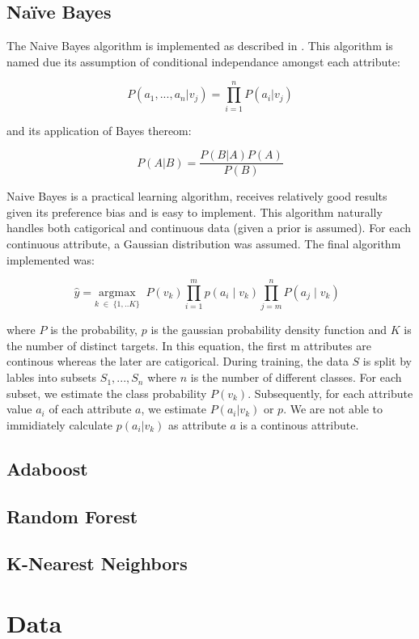 \documentclass[11pt]{article}
\begin{document}
\subsection{Naïve Bayes}
The Naive Bayes algorithm is implemented as described in \cite{Mitchell:1997:ML:541177}. This algorithm is named due its assumption of conditional independance amongst each attribute:

$$P(a_1,...,a_n|v_j) = \prod_{i=1}^{n}P(a_i|v_j)$$

and its application of Bayes thereom:

$$P(A|B) = \frac{P(B|A)P(A)}{P(B)}$$

Naive Bayes is a practical learning algorithm, receives relatively good results given its preference bias and is easy to implement. This algorithm naturally handles both catigorical and continuous data (given a prior is assumed). For each continuous attribute, a Gaussian distribution was assumed. The final algorithm implemented was:

$$\hat{y}= \underset{k\;\in\;\{1,..K\}} {\mathrm{argmax}} \;\;P(v_k)\prod_{i=1}^mp\left(a_i\;|\;v_k\right)\prod_{j=m}^nP\left(a_j\;|\;v_k\right)\;\;$$

where $P$ is the probability, $p$ is the gaussian probability density function and $K$ is the number of distinct targets. In this equation, the first m attributes are continous whereas the later are catigorical. During training, the data $S$ is split by lables into subsets ${S_1,...,S_n}$ where $n$ is the number of different classes. For each subset, we estimate the class probability $P(v_k)$. Subsequently, for each attribute value $a_i$ of each attribute $a$, we estimate $P(a_i|v_k)$ or $p$. We are not able to immidiately calculate $p(a_i|v_k)$ as attribute $a$ is a continous attribute.

\subsection{Adaboost}
\subsection{Random Forest}
\subsection{K-Nearest Neighbors}

\section{Data}
\end{document}

